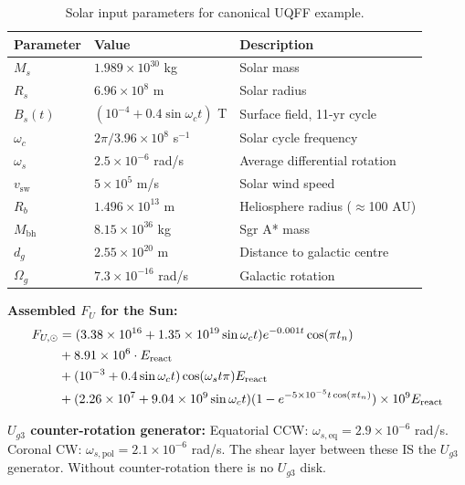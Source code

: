 \documentclass[12pt,a4paper]{article}
\begin{document}
\begin{table}[H]
\centering
\begin{tabular}{@{}lll@{}}
\toprule
\textbf{Parameter} & \textbf{Value} & \textbf{Description} \\
\midrule
$M_s$ & $1.989\times10^{30}$ kg & Solar mass \\
$R_s$ & $6.96\times10^8$ m & Solar radius \\
$B_s(t)$ & $(10^{-4} + 0.4\sin\omega_c t)$ T & Surface field, 11-yr cycle \\
$\omega_c$ & $2\pi/3.96\times10^8$ s$^{-1}$ & Solar cycle frequency \\
$\omega_s$ & $2.5\times10^{-6}$ rad/s & Average differential rotation \\
$v_{\text{sw}}$ & $5\times10^5$ m/s & Solar wind speed \\
$R_b$ & $1.496\times10^{13}$ m & Heliosphere radius ($\approx$100 AU) \\
$M_{\text{bh}}$ & $8.15\times10^{36}$ kg & Sgr A* mass \\
$d_g$ & $2.55\times10^{20}$ m & Distance to galactic centre \\
$\Omega_g$ & $7.3\times10^{-16}$ rad/s & Galactic rotation \\
\bottomrule
\end{tabular}
\caption{Solar input parameters for canonical UQFF example.}
\label{tab:solar_params}
\end{table}

\noindent\textbf{Assembled $F_U$ for the Sun:}
\begin{align}
  F_{U,\odot} &=
    (3.38\times10^{16} + 1.35\times10^{19}\sin\omega_c t)
    e^{-0.001t}\cos(\pi t_n) \notag\\
  &+ 8.91\times10^6 \cdot E_{\text{react}} \notag\\
  &+ (10^{-3} + 0.4\sin\omega_c t)\cos(\omega_s t\pi) E_{\text{react}} \notag\\
  &+ (2.26\times10^7 + 9.04\times10^9\sin\omega_c t)
    (1-e^{-5\times10^{-5}t\cos(\pi t_n)}) \times 10^9 E_{\text{react}}
  \label{eq:fu_sun}
\end{align}

\noindent\textbf{$U_{g3}$ counter-rotation generator:}
Equatorial CCW: $\omega_{s,\text{eq}} = 2.9\times10^{-6}$ rad/s.
Coronal CW: $\omega_{s,\text{pol}} = 2.1\times10^{-6}$ rad/s.
The shear layer between these IS the $U_{g3}$ generator.
Without counter-rotation there is no $U_{g3}$ disk.

\end{document}
